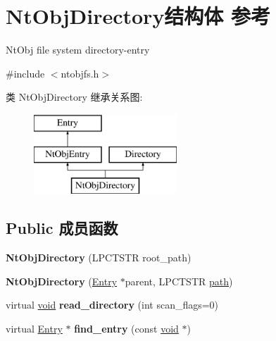 \hypertarget{struct_nt_obj_directory}{}\section{Nt\+Obj\+Directory结构体 参考}
\label{struct_nt_obj_directory}


Nt\+Obj file system directory-\/entry  




{\ttfamily \#include $<$ntobjfs.\+h$>$}

类 Nt\+Obj\+Directory 继承关系图\+:\begin{figure}[H]
\begin{center}
\leavevmode
\includegraphics[height=3.000000cm]{struct_nt_obj_directory}
\end{center}
\end{figure}
\subsection*{Public 成员函数}
\begin{DoxyCompactItemize}
\item 
\mbox{\label{struct_nt_obj_directory_a5a97849a904906cf83d217ffd20cf4d9}} 
{\bfseries Nt\+Obj\+Directory} (L\+P\+C\+T\+S\+TR root\+\_\+path)
\item 
\mbox{\label{struct_nt_obj_directory_a16e33a697fe9be183cd26f24e871bffc}} 
{\bfseries Nt\+Obj\+Directory} (\hyperlink{struct_entry}{Entry} $\ast$parent, L\+P\+C\+T\+S\+TR \hyperlink{structpath}{path})
\item 
\mbox{\label{struct_nt_obj_directory_a47c52926f6eb54b60d90b678128d5622}} 
virtual \hyperlink{interfacevoid}{void} {\bfseries read\+\_\+directory} (int scan\+\_\+flags=0)
\item 
\mbox{\label{struct_nt_obj_directory_a2484080c66b3eef5a890c5d094807f33}} 
virtual \hyperlink{struct_entry}{Entry} $\ast$ {\bfseries find\+\_\+entry} (const \hyperlink{interfacevoid}{void} $\ast$)
\end{DoxyCompactItemize}
